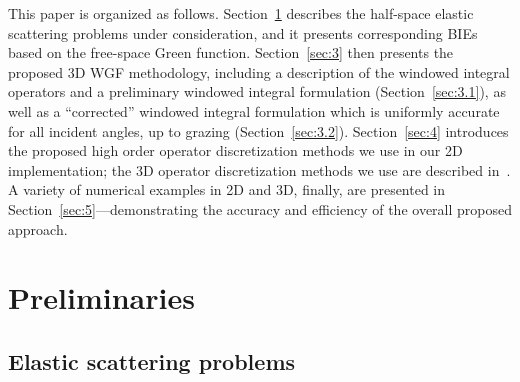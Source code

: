 \documentclass[10pt]{article}
\numberwithin{equation}{section}
\begin{document}
This paper is organized as follows. Section~\ref{sec:2} describes the
half-space elastic scattering problems under consideration, and it
presents corresponding BIEs based on the free-space Green
function. Section~\ref{sec:3} then presents the proposed 3D WGF
methodology, including a description of the windowed integral
operators and a preliminary windowed integral formulation
(Section~\ref{sec:3.1}), as well as a ``corrected'' windowed integral
formulation which is uniformly accurate for all incident angles, up to
grazing (Section~\ref{sec:3.2}). Section~\ref{sec:4} introduces the
proposed high order operator discretization methods we use in our 2D
implementation; the 3D operator discretization methods we use are
described in~\cite{BG18,BY19}. A variety of numerical examples in 2D
and 3D, finally, are presented in Section~\ref{sec:5}---demonstrating
the accuracy and efficiency of the overall proposed approach.

\section{Preliminaries}
\label{sec:2}
\subsection{Elastic scattering problems}
\label{sec:2.1}
\end{document}
